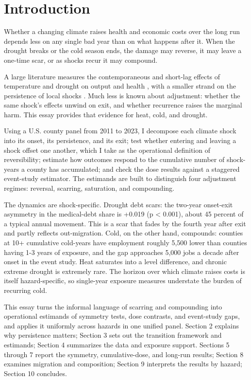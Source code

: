 \documentclass[a4paper,11pt]{article}
\begin{document}
\section{Introduction}

Whether a changing climate raises health and economic costs over the long run depends less on any single bad year than on what happens after it. When the drought breaks or the cold season ends, the damage may reverse, it may leave a one-time scar, or as shocks recur it may compound.

A large literature measures the contemporaneous and short-lag effects of temperature and drought on output and health \citep{dell2014weather}, with a smaller strand on the persistence of local shocks \citep{hsiang2014cyclones,deryugina2018katrina}. Much less is known about adjustment: whether the same shock's effects unwind on exit, and whether recurrence raises the marginal harm. This essay provides that evidence for heat, cold, and drought.

Using a U.S. county panel from 2011 to 2023, I decompose each climate shock into its onset, its persistence, and its exit; test whether entering and leaving a shock offset one another, which I take as the operational definition of reversibility; estimate how outcomes respond to the cumulative number of shock-years a county has accumulated; and check the dose results against a staggered event-study estimator. The estimands are built to distinguish four adjustment regimes: reversal, scarring, saturation, and compounding.

The dynamics are shock-specific. Drought debt scars: the two-year onset-exit asymmetry in the medical-debt share is +0.019 (p < 0.001), about 45 percent of a typical annual movement. This is a scar that fades by the fourth year after exit and partly reflects out-migration. Cold, on the other hand, compounds: counties at 10+ cumulative cold-years have employment roughly 5,500 lower than counties having 1-3 years of exposure, and the gap approaches 5,000 jobs a decade after onset in the event study. Heat saturates into a level difference, and chronic extreme drought is extremely rare. The horizon over which climate raises costs is itself hazard-specific, so single-year exposure measures understate the burden of recurring cold.

This essay turns the informal language of scarring and compounding into operational estimands of symmetry tests, dose contrasts, and event-study gaps, and applies it uniformly across hazards in one unified panel. Section 2 explains why persistence matters; Section 3 sets out the transition framework and estimands; Section 4 summarizes the data and exposure support. Sections 5 through 7 report the symmetry, cumulative-dose, and long-run results; Section 8 examines migration and composition; Section 9 interprets the results by hazard; Section 10 concludes.
\end{document}
